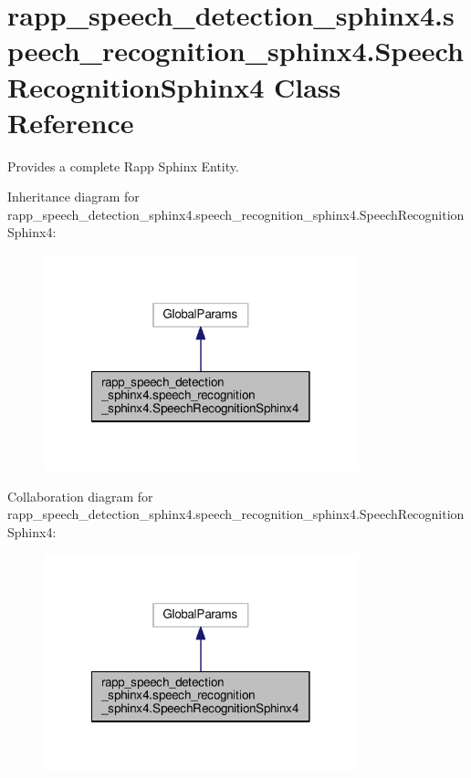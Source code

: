 \hypertarget{classrapp__speech__detection__sphinx4_1_1speech__recognition__sphinx4_1_1SpeechRecognitionSphinx4}{\section{rapp\-\_\-speech\-\_\-detection\-\_\-sphinx4.\-speech\-\_\-recognition\-\_\-sphinx4.\-Speech\-Recognition\-Sphinx4 Class Reference}
\label{classrapp__speech__detection__sphinx4_1_1speech__recognition__sphinx4_1_1SpeechRecognitionSphinx4}
}


Provides a complete Rapp Sphinx Entity.  




Inheritance diagram for rapp\-\_\-speech\-\_\-detection\-\_\-sphinx4.\-speech\-\_\-recognition\-\_\-sphinx4.\-Speech\-Recognition\-Sphinx4\-:
\nopagebreak
\begin{figure}[H]
\begin{center}
\leavevmode
\includegraphics[width=258pt]{classrapp__speech__detection__sphinx4_1_1speech__recognition__sphinx4_1_1SpeechRecognitionSphinx4__inherit__graph}
\end{center}
\end{figure}


Collaboration diagram for rapp\-\_\-speech\-\_\-detection\-\_\-sphinx4.\-speech\-\_\-recognition\-\_\-sphinx4.\-Speech\-Recognition\-Sphinx4\-:
\nopagebreak
\begin{figure}[H]
\begin{center}
\leavevmode
\includegraphics[width=258pt]{classrapp__speech__detection__sphinx4_1_1speech__recognition__sphinx4_1_1SpeechRecognitionSphinx4__coll__graph}
\end{center}
\end{figure}
